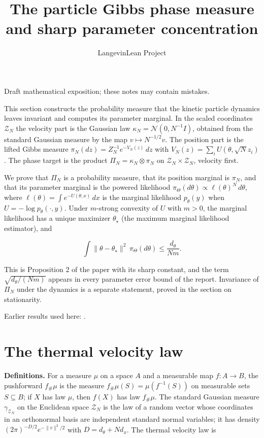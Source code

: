 \documentclass[11pt,a4paper]{article}
\title{\texorpdfstring{The particle Gibbs phase measure and sharp parameter concentration}{The particle Gibbs phase measure and sharp parameter concentration}}
\author{LangevinLean Project}
\date{}
\begin{document}
\maketitle
Draft mathematical exposition; these notes may contain mistakes.


This section constructs the probability measure that the kinetic particle dynamics leaves invariant and computes its parameter marginal. In the scaled coordinates \(\mathcal Z_N\) the velocity part is the Gaussian law \(\kappa_N=\mathcal N(0,N^{-1}I)\), obtained from the standard Gaussian measure by the map \(v\mapsto N^{-1/2}v\). The position part is the lifted Gibbs measure \(\pi_N(dz)=Z_N^{-1}e^{-V_N(z)}\,dz\) with \(V_N(z)=\sum_iU(\theta,\sqrt Nz_i)\). The phase target is the product \(\Pi_N=\kappa_N\otimes\pi_N\) on \(\mathcal Z_N\times\mathcal Z_N\), velocity first.




We prove that \(\Pi_N\) is a probability measure, that its position marginal is \(\pi_N\), and that its parameter marginal is the powered likelihood \(\pi_\Theta(d\theta)\propto\ell(\theta)^N\,d\theta\), where \(\ell(\theta)=\int e^{-U(\theta,x)}\,dx\) is the marginal likelihood \(p_\theta(y)\) when \(U=-\log p_\theta(\cdot,y)\). Under \(m\)-strong convexity of \(U\) with \(m>0\), the marginal likelihood has a unique maximizer \(\theta_\star\) (the maximum marginal likelihood estimator), and


\[\int\|\theta-\theta_\star\|^2\,\pi_\Theta(d\theta)\le\frac{d_\theta}{Nm}.\]


This is Proposition 2 of the paper with its sharp constant, and the term \(\sqrt{d_\theta/(Nm)}\) appears in every parameter error bound of the report. Invariance of \(\Pi_N\) under the dynamics is a separate statement, proved in the section on stationarity.



Earlier results used here: \cite[Section~3.6]{LangevinLean2026Proximal}.

\section{\texorpdfstring{The thermal velocity law}{The thermal velocity law}}


\textbf{Definitions.} For a measure \(\mu\) on a space \(A\) and a measurable map \(f:A\to B\), the pushforward \(f_\#\mu\) is the measure \(f_\#\mu(S)=\mu(f^{-1}(S))\) on measurable sets \(S\subseteq B\); if \(X\) has law \(\mu\), then \(f(X)\) has law \(f_\#\mu\). The standard Gaussian measure \(\gamma_{\mathcal Z_N}\) on the Euclidean space \(\mathcal Z_N\) is the law of a random vector whose coordinates in an orthonormal basis are independent standard normal variables; it has density \((2\pi)^{-D/2}e^{-\|v\|^2/2}\) with \(D=d_\theta+Nd_x\). The thermal velocity law is
\end{document}

